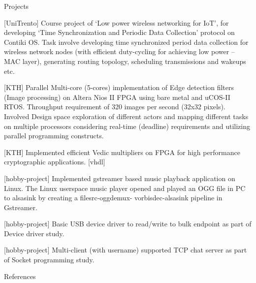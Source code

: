 \documentclass[
	a4paper, %
	11pt, %
]{resume} %
\begin{document}
\begin{rSection}{Projects}

        \item {[UniTrento]} Course project of ‘Low power wireless networking for IoT’, for developing ‘Time Synchronization and Periodic Data Collection’ protocol on Contiki OS. Task involve developing time synchronized period data collection for wireless network nodes (with efficient duty-cycling for achieving low power – MAC layer), generating routing topology, scheduling transmissions and wakeups etc.
        \item {[KTH]} Parallel Multi-core (5-cores) implementation of Edge detection filters (Image processing) on Altera Nios II FPGA using bare metal and uCOS-II RTOS. Throughput requirement of 320 images per second (32x32 pixels). Involved Design space exploration of different actors and mapping different tasks on multiple processors considering real-time (deadline) requirements and utilizing parallel programming constructs.
        \item {[KTH]} Implemented efficient Vedic multipliers on FPGA for high performance cryptographic applications. {[vhdl]}
        \item {[hobby-project]} Implemented gstreamer based music playback application on Linux. The Linux userspace music player opened and played an OGG file in PC to alsasink by creating a filesrc-oggdemux- vorbisdec-alsasink pipeline in Gstreamer.
        \item {[hobby-project]} Basic USB device driver to read/write to bulk endpoint as part of Device driver study.
        \item {[hobby-project]} Multi-client (with username) supported TCP chat server as part of Socket programming study.

\end{rSection}



\begin{rSection}{References}

\end{rSection}

\end{document}
